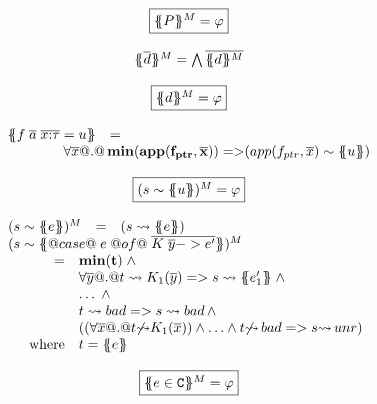 \documentclass[preprint]{sigplanconf}
\begin{document}
\begin{figure}
\setlength{\arraycolsep}{2pt}
\[\begin{array}{c}
\ruleform{\ptrans{\Sigma}{P}^M = \formula{\phi} } \\ \\ 
\ptrans{\Sigma}{\ol{d}}^M = \bigwedge \ol{\dtrans{\Sigma}{d}^M}
\\ \\
\ruleform{\dtrans{\Sigma}{d}^M = \formula{\phi}} \\ \\
\begin{array}{lcl}
  \dtrans{\Sigma}{f \;\ol{a}\;\ol{x{:}\tau} = u} & = &  \\ 
  \multicolumn{3}{l}{\qquad\qquad \formula{\forall\ol{x} @.@\, {\bf min(app(f_{ptr},\xs)) => } \utrans{\sigma}{u}{app(f_{ptr},\xs)}}} \\
\end{array} \\ \\ 
\ruleform{\utrans{\Sigma}{u}{s}^M = \formula{\phi}} \\ \\
\begin{array}{rcl}
\utrans{\Sigma}{e}{s}^M
  & = & \formula{(s \red \etrans{\Sigma}{\Gamma}{e})} \\
\multicolumn{3}{l}{\utrans{\Sigma}
    {@case@\;e\;@of@\;\ol{K\;\ol{y} -> e'}}{s}^M} \\
\multicolumn{3}{l}{
\quad
  \begin{array}[t]{rl}
    = & {\bf min(t)} \;  \land \\
      & \formula{\forall\ol{y} @.@ t \red K_1(\ol{y}) => s \red \etrans{\Sigma}{\Gamma}{e'_1}\;\land}  \\
      & \ldots \;\land \\
      & \formula{t \red \bad => s \red \bad \land}  \\
      & \formula{((\forall \xs @.@ t{\not\red}K_1(\xs)) \land \ldots \land t{\not\red}\bad => s{\red}\unr)} \\
    \mbox{where} & t  =  \etrans{\Sigma}{\Gamma}{e}
 \end{array}
}
\end{array}
\\ \\
\ruleform{\ctrans{\Sigma}{\Gamma}{e \in \Ct}^M = \formula{\phi}} \\ \\

\end{array}\]
\end{figure}
\end{document}
